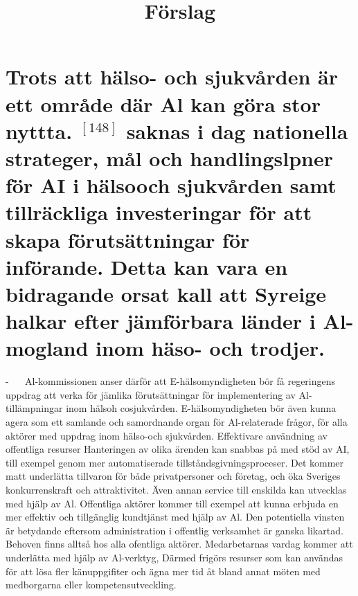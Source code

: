 {{{{{{{{{{{{{{\section*{Trots att hälso- och sjukvården är ett område där Al kan göra stor nyttta. \({ }^{[148]}\) saknas i dag nationella strateger, mål och handlingslpner för AI i hälsooch sjukvården samt tillräckliga investeringar för att skapa förutsättningar för införande. Detta kan vara en bidragande orsat kall att Syreige halkar efter jämförbara länder i Al-mogland inom häso- och trodjer.}

\title{
Förslag
}
- \(\quad\) Al-kommissionen anser därför att
E-hälsomyndigheten bör få regeringens uppdrag att verka för jämlika förutsättningar för implementering av Al-tillämpningar inom hälsoh cosjukvården. E-hälsomyndigheten bör även kunna agera som ett samlande och samordnande organ för Al-relaterade frågor, för alla aktörer med uppdrag inom hälso-och sjukvården.
Effektivare användning av offentliga resurser Hanteringen av olika ärenden kan snabbas på med stöd av AI, till exempel genom mer automatiserade tillståndsgivningsproceser. Det kommer matt
underlätta tillvaron för både privatpersoner och företag, och öka Sveriges konkurrenskraft och attraktivitet. Även annan service till enskilda kan utvecklas med hjälp av Al. Offentliga aktörer kommer till exempel att kunna erbjuda en mer effektiv och tillgänglig kundtjänst med hjälp av Al. Den potentiella vinsten är betydande eftersom administration i offentlig verksamhet är ganska likartad. Behoven finns alltså hos alla ofentliga aktörer. Medarbetarnas vardag kommer att underlätta med hjälp av Al-verktyg, Därmed frigörs resurser som kan användas för att lösa fler känuppgifiter och ägna mer tid åt bland annat möten med medborgarna eller kompetensutveckling.
}}}}}}}}}}}}}}
